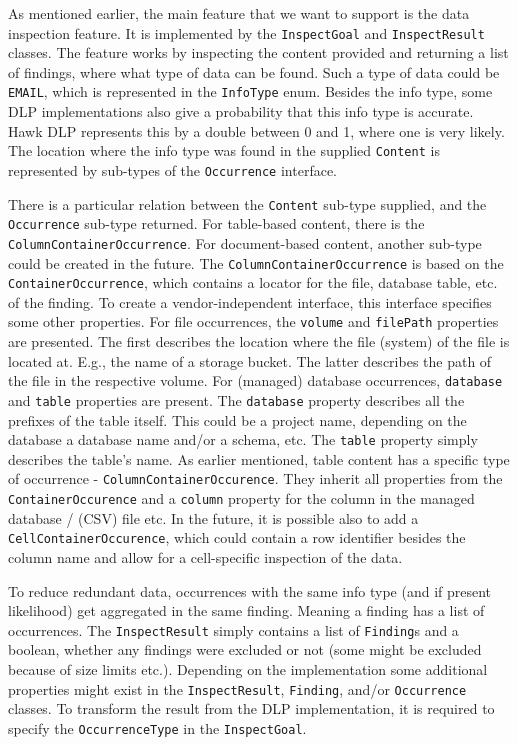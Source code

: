 As mentioned earlier, the main feature that we want to support is the data inspection feature. It is implemented by the \texttt{InspectGoal} and \texttt{InspectResult} classes. The feature works by inspecting the content provided and returning a list of findings, where what type of data can be found. Such a type of data could be \texttt{EMAIL}, which is represented in the \texttt{InfoType} enum. Besides the info type, some DLP implementations also give a probability that this info type is accurate. Hawk DLP represents this by a double between 0 and 1, where one is very likely. The location where the info type was found in the supplied \texttt{Content} is represented by sub-types of the \texttt{Occurrence} interface. 


There is a particular relation between the \texttt{Content} sub-type supplied, and the \texttt{Occurrence} sub-type returned. For table-based content, there is the \texttt{ColumnContainerOccurrence}. For document-based content, another sub-type could be created in the future. The \texttt{ColumnContainerOccurrence} is based on the \texttt{ContainerOccurrence}, which contains a locator for the file, database table, etc. of the finding. To create a vendor-independent interface, this interface specifies some other properties. 
For file occurrences, the \texttt{volume} and \texttt{filePath} properties are presented. The first describes the location where the file (system) of the file is located at. E.g., the name of a storage bucket. The latter describes the path of the file in the respective volume.
For (managed) database occurrences, \texttt{database} and \texttt{table} properties are present. The \texttt{database} property describes all the prefixes of the table itself. This could be a project name, depending on the database a database name and/or a schema, etc. The \texttt{table} property simply describes the table's name.
As earlier mentioned, table content has a specific type of occurrence - \texttt{ColumnContainerOccurence}. They inherit all properties from the \texttt{ContainerOccurence} and a \texttt{column} property for the column in the managed database / (CSV) file etc.
In the future, it is possible also to add a \texttt{CellContainerOccurence}, which could contain a row identifier besides the column name and allow for a cell-specific inspection of the data.

To reduce redundant data, occurrences with the same info type (and if present likelihood) get aggregated in the same finding. Meaning a finding has a list of occurrences. The \texttt{InspectResult} simply contains a list of \texttt{Finding}s and a boolean, whether any findings were excluded or not (some might be excluded because of size limits etc.). Depending on the implementation some additional properties might exist in the \texttt{InspectResult}, \texttt{Finding}, and/or \texttt{Occurrence} classes. To transform the result from the DLP implementation, it is required to specify the \texttt{OccurrenceType} in the \texttt{InspectGoal}.

